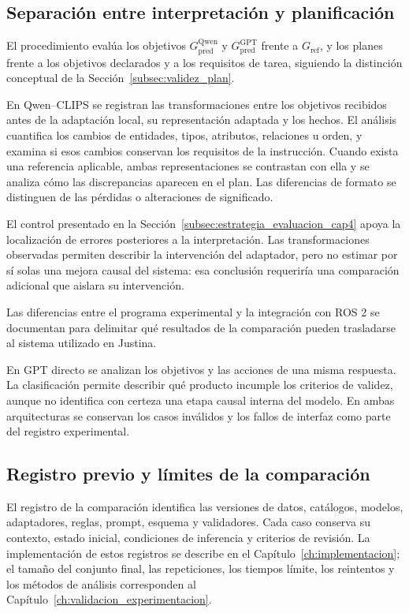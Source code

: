 \subsection{Separación entre interpretación y planificación}
\label{subsec:separacion_etapas_cap4}

El procedimiento evalúa los objetivos \(G_{\mathrm{pred}}^{\mathrm{Qwen}}\) y \(G_{\mathrm{pred}}^{\mathrm{GPT}}\) frente a \(G_{\mathrm{ref}}\), y los planes frente a los objetivos declarados y a los requisitos de tarea, siguiendo la distinción conceptual de la Sección~\ref{subsec:validez_plan}.

En Qwen--CLIPS se registran las transformaciones entre los objetivos recibidos antes de la adaptación local, su representación adaptada y los hechos. El análisis cuantifica los cambios de entidades, tipos, atributos, relaciones u orden, y examina si esos cambios conservan los requisitos de la instrucción. Cuando exista una referencia aplicable, ambas representaciones se contrastan con ella y se analiza cómo las discrepancias aparecen en el plan. Las diferencias de formato se distinguen de las pérdidas o alteraciones de significado.

El control presentado en la Sección~\ref{subsec:estrategia_evaluacion_cap4} apoya la localización de errores posteriores a la interpretación. Las transformaciones observadas permiten describir la intervención del adaptador, pero no estimar por sí solas una mejora causal del sistema: esa conclusión requeriría una comparación adicional que aislara su intervención.

Las diferencias entre el programa experimental y la integración
con ROS 2 se documentan para delimitar qué resultados de la
comparación pueden trasladarse al sistema utilizado en Justina.

En GPT directo se analizan los objetivos y las acciones de una misma
respuesta. La clasificación permite describir qué producto incumple
los criterios de validez, aunque no identifica con certeza una etapa
causal interna del modelo. En ambas arquitecturas se conservan los
casos inválidos y los fallos de interfaz como parte del registro
experimental.

\subsection{Registro previo y límites de la comparación}
\label{subsec:registro_previo_comparacion}

El registro de la comparación identifica las versiones de datos, catálogos, modelos, adaptadores, reglas, prompt, esquema y validadores. Cada caso conserva su contexto, estado inicial, condiciones de inferencia y criterios de revisión. La implementación de estos registros se describe en el Capítulo~\ref{ch:implementacion}; el tamaño del conjunto final, las repeticiones, los tiempos límite, los reintentos y los métodos de análisis corresponden al Capítulo~\ref{ch:validacion_experimentacion}.

